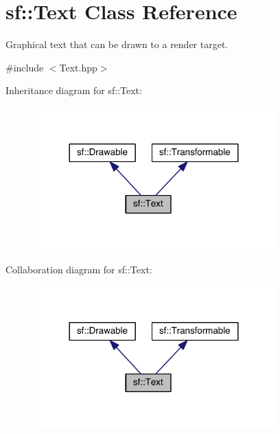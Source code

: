 \hypertarget{classsf_1_1_text}{\section{sf\-:\-:Text Class Reference}
\label{classsf_1_1_text}
}


Graphical text that can be drawn to a render target.  




{\ttfamily \#include $<$Text.\-hpp$>$}



Inheritance diagram for sf\-:\-:Text\-:
\nopagebreak
\begin{figure}[H]
\begin{center}
\leavevmode
\includegraphics[width=264pt]{classsf_1_1_text__inherit__graph}
\end{center}
\end{figure}


Collaboration diagram for sf\-:\-:Text\-:
\nopagebreak
\begin{figure}[H]
\begin{center}
\leavevmode
\includegraphics[width=264pt]{classsf_1_1_text__coll__graph}
\end{center}
\end{figure}
